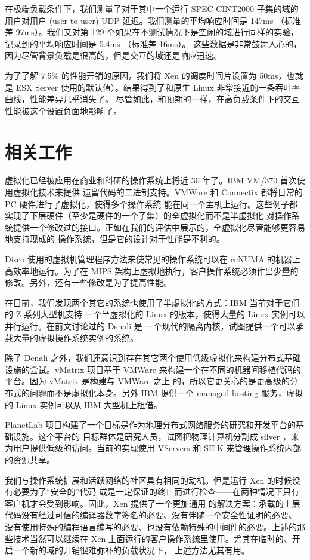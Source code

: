 在极端负载条件下，我们测量了对于其中一个运行 SPEC CINT2000 子集的域的用户对用户
(user-to-user) UDP 延迟。我们测量的平均响应时间是 147ms （标准差 97ms）。我们又对第 129
个如果在不测试情况下是空闲的域进行同样的实验，记录到的平均响应时间是 5.4ms （标准差 16ms）。
这些数据是非常鼓舞人心的，因为尽管背景负载是很高的，但是交互的域还是响应迅速。

为了了解 7.5\% 的性能开销的原因，我们将 Xen 的调度时间片设置为 50ms，也就是 ESX Server
使用的默认值）。结果得到了和原生 Linux 非常接近的一条吞吐率曲线，性能差异几乎消失了。
尽管如此，和预期的一样，在高负载条件下的交互性能被这个设置负面地影响了。

\section{相关工作}

虚拟化已经被应用在商业和科研的操作系统上将近 30 年了。IBM VM/370 首次使用虚拟化技术来提供
遗留代码的二进制支持。VMWare 和 Connectix 都将日常的 PC 硬件进行了虚拟化，使得多个操作系统
能在同一个主机上运行。这些例子都实现了下层硬件（至少是硬件的一个子集）的全虚拟化而不是半虚拟化
对操作系统提供一个修改过的接口。正如在我们的评估中展示的，全虚拟化尽管能够更容易地支持现成的
操作系统，但是它的设计对于性能是不利的。

Disco 使用的虚拟机管理程序方法来使常见的操作系统可以在 ccNUMA 的机器上高效率地运行。为了在
MIPS 架构上虚拟地执行，客户操作系统必须作出少量的修改。另外，还有一些修改是为了提高性能。

在目前，我们发现两个其它的系统也使用了半虚拟化的方式：IBM 当前对于它们的 Z 系列大型机支持
一个半虚拟化的 Linux 的版本，使得大量的 Linux 实例可以并行运行。在前文讨论过的 Denali 是
一个现代的隔离内核，试图提供一个可以承载大量的虚拟操作系统实例的系统。

除了 Denali 之外，我们还意识到存在其它两个使用低级虚拟化来构建分布式基础设施的尝试。vMatrix
项目基于 VMWare 来构建一个在不同的机器间移植代码的平台。因为 vMatrix 是构建与 VMWare 之上
的，所以它更关心的是更高级的分布式的问题而不是虚拟化本身。另外 IBM 提供一个 managed hosting
服务，虚拟的 Linux 实例可以从 IBM 大型机上租借。

PlanetLab 项目构建了一个目标是作为地理分布式网络服务的研究和开发平台的基础设施。这个平台的
目标群体是研究人员，试图把物理计算机分割成 silver ，来为用户提供低级的访问。当前的实现使用
VServers 和 SILK 来管理操作系统内部的资源共享。

我们与操作系统扩展和活跃网络的社区具有相同的动机。但是运行 Xen 的时候没有必要为了“安全的”代码
或是一定保证的终止而进行检查——在两种情况下只有客户机才会受到影响。因此，Xen 提供了一个更加通用
的解决方案：承载的上层代码没有经过可信的编译器数字签名的必要、没有伴随一个安全性证明的必要、
没有使用特殊的编程语言编写的必要、也没有依赖特殊的中间件的必要。上述的那些技术当然可以继续在
Xen 上面运行的客户操作系统里使用。尤其在临时的、开启一个新的域的开销很难弥补的负载状况下，
上述方法尤其有用。

